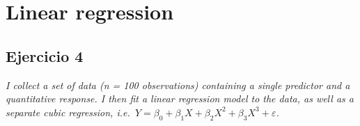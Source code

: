 \documentclass[
]{book}
\begin{document}
\hypertarget{linear-regression}{%
\chapter{Linear regression}\label{linear-regression}}

\hypertarget{ejercicio-4}{%
\section*{Ejercicio 4}\label{ejercicio-4}}

\emph{I collect a set of data (n = 100 observations) containing a single
predictor and a quantitative response. I then fit a linear regression
model to the data, as well as a separate cubic regression,
i.e.~\(Y = \beta_{0} + \beta_{1}X + \beta_{2}X^{2} + \beta_{3}X^{3} + \varepsilon\).}
\end{document}
